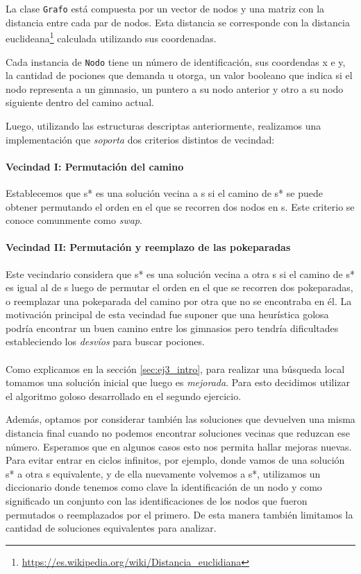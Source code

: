 La clase \texttt{Grafo} est\'a compuesta por un vector de nodos y una matriz con la distancia entre cada par de nodos. Esta distancia se corresponde con la distancia euclideana\footnote{\url{https://es.wikipedia.org/wiki/Distancia_euclidiana}} calculada utilizando sus coordenadas.

Cada instancia de \texttt{Nodo} tiene un n\'umero de identificaci\'on, sus coordendas x e y, la cantidad de pociones que demanda u otorga, un valor booleano que indica si el nodo representa a un gimnasio, un puntero a su nodo anterior y otro a su nodo siguiente dentro del camino actual.

Luego, utilizando las estructuras descriptas anteriormente, realizamos una implementaci\'on que \textit{soporta} dos criterios distintos de vecindad:

\paragraph{Vecindad I: Permutaci\'on del camino}
Establecemos que s* es una soluci\'on vecina a s si el camino de s* se puede obtener permutando el orden en el que se recorren dos nodos en s. Este criterio se conoce comunmente como \textit{swap}.

\paragraph{Vecindad II: Permutaci\'on y reemplazo de las pokeparadas}
Este vecindario considera que s* es una soluci\'on vecina a otra s si el camino de s* es igual al de s luego de permutar el orden en el que se recorren dos pokeparadas, o reemplazar una pokeparada del camino por otra que no se encontraba en \'el. La motivaci\'on principal de esta vecindad fue suponer que una heur\'istica golosa podr\'ia encontrar un buen camino entre los gimnasios pero tendr\'ia dificultades estableciendo los \textit{desv\'ios} para buscar pociones.

\paragraph{}
Como explicamos en la secci\'on \ref{sec:ej3_intro}, para realizar una b\'usqueda local tomamos una soluci\'on inicial que luego es \textit{mejorada}. Para esto decidimos utilizar el algoritmo goloso desarrollado en el segundo ejercicio.

Adem\'as, optamos por considerar tambi\'en las soluciones que devuelven una misma distancia final cuando no podemos encontrar soluciones vecinas que reduzcan ese n\'umero. Esperamos que en algunos casos esto nos permita hallar mejoras nuevas. Para evitar entrar en ciclos infinitos, por ejemplo, donde vamos de una soluci\'on s* a otra s equivalente, y de ella nuevamente volvemos a s*, utilizamos un diccionario donde tenemos como clave la identificaci\'on de un nodo y como significado un conjunto con las identificaciones de los nodos que fueron permutados o reemplazados por el primero. De esta manera tambi\'en limitamos la cantidad de soluciones equivalentes para analizar.

